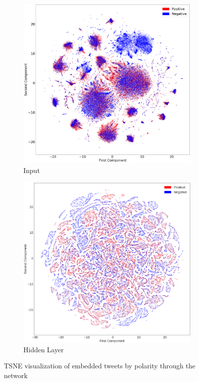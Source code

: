 \documentclass[10pt,conference,compsocconf,retainorgcmds]{IEEEtran}
\begin{document}
\begin{figure}[h]
    \centering
    \begin{subfigure}[b]{0.5\textwidth}
        \includegraphics[scale=0.15]{imag/tweets_tsne.png}
        \caption{Input}
        \label{input}
    \end{subfigure}
    \begin{subfigure}[b]{0.5\textwidth}
        \includegraphics[scale=0.15]{imag/non_tweets_tsne.png}
        \caption{Hidden Layer}
        \label{hidden}
    \end{subfigure}
    \caption{TSNE visualization of embedded tweets by polarity through the network}
    \label{Corr}
\end{figure}
\end{document}
